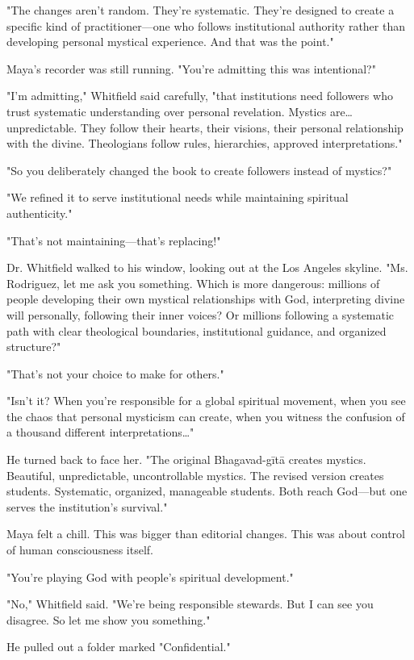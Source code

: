 \documentclass[11pt,twoside]{book}
\begin{document}
"The changes aren't random. They're systematic. They're designed to create a specific kind of practitioner—one who follows institutional authority rather than developing personal mystical experience. And that was the point."

Maya's recorder was still running. "You're admitting this was intentional?"

"I'm admitting," Whitfield said carefully, "that institutions need followers who trust systematic understanding over personal revelation. Mystics are\ldots{} unpredictable. They follow their hearts, their visions, their personal relationship with the divine. Theologians follow rules, hierarchies, approved interpretations."

"So you deliberately changed the book to create followers instead of mystics?"

"We refined it to serve institutional needs while maintaining spiritual authenticity."

"That's not maintaining—that's replacing!"

Dr. Whitfield walked to his window, looking out at the Los Angeles skyline. "Ms. Rodriguez, let me ask you something. Which is more dangerous: millions of people developing their own mystical relationships with God, interpreting divine will personally, following their inner voices? Or millions following a systematic path with clear theological boundaries, institutional guidance, and organized structure?"

"That's not your choice to make for others."

"Isn't it? When you're responsible for a global spiritual movement, when you see the chaos that personal mysticism can create, when you witness the confusion of a thousand different interpretations\ldots{}"

He turned back to face her. "The original Bhagavad-gītā creates mystics. Beautiful, unpredictable, uncontrollable mystics. The revised version creates students. Systematic, organized, manageable students. Both reach God—but one serves the institution's survival."

Maya felt a chill. This was bigger than editorial changes. This was about control of human consciousness itself.

"You're playing God with people's spiritual development."

"No," Whitfield said. "We're being responsible stewards. But I can see you disagree. So let me show you something."

He pulled out a folder marked "Confidential."
\end{document}
